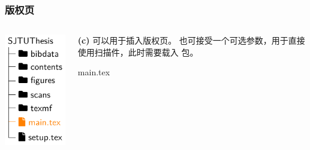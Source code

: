 \begin{frame}[fragile]
  \frametitle{版权页}
  \begin{columns}
    \begin{column}{0.4\textwidth}
      \includegraphics[page=5]{support/figures/thesisdir.pdf}
    \end{column}
    \begin{column}{0.6\textwidth}
      \alert{\textbf{(c)}}  可以用于插入版权页。
      也可接受一个可选参数，用于直接使用扫描件，此时需要载入  包。

      \begin{codeblock}[firstnumber=22]{main.tex}
\copyrightpage
      \end{codeblock}
    \end{column}
  \end{columns}
\end{frame}

